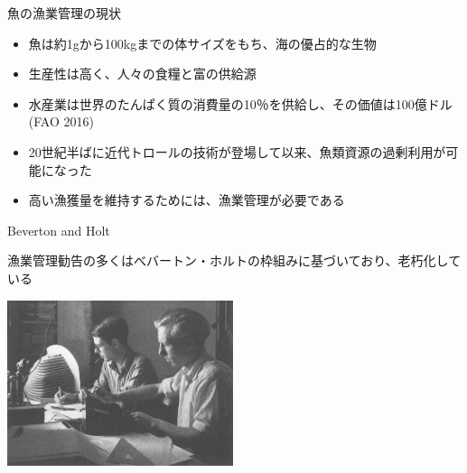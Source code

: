\documentclass[
  ignorenonframetext,
]{beamer}
\providecommand{\tightlist}{%
  \setlength{\itemsep}{0pt}\setlength{\parskip}{0pt}}
\begin{document}
\begin{frame}{魚の漁業管理の現状}
\protect\hypertarget{ux9b5aux306eux6f01ux696dux7ba1ux7406ux306eux73feux72b6}{}

\begin{itemize}
\tightlist
\item
  魚は約1gから100kgまでの体サイズをもち、海の優占的な生物\\
  \vspace{6mm}
\item
  生産性は高く、人々の食糧と富の供給源\\
  \vspace{6mm}
\item
  水産業は世界のたんぱく質の消費量の10％を供給し、その価値は100億ドル
  (FAO 2016)\\
  \vspace{6mm}
\item
  20世紀半ばに近代トロールの技術が登場して以来、魚類資源の過剰利用が可能になった\\
  \vspace{6mm}
\item
  高い漁獲量を維持するためには、漁業管理が必要である
\end{itemize}

\end{frame}

\begin{frame}{Beverton and Holt}
\protect\hypertarget{beverton-and-holt}{}

漁業管理勧告の多くはべバートン・ホルトの枠組みに基づいており、老朽化している

\begin{center}\includegraphics[width=250px]{Fig1} \end{center}

\end{frame}
\end{document}
